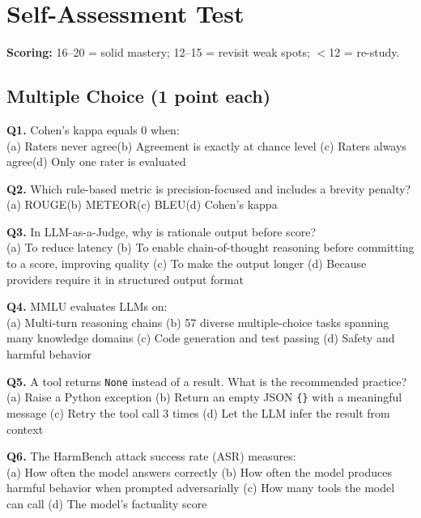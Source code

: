 \documentclass[11pt, a4paper]{article}
\begin{document}
\newpage
\section{Self-Assessment Test}

\textbf{Scoring:} 16--20 = solid mastery; 12--15 = revisit weak spots; $<$12 = re-study.

\subsection*{Multiple Choice (1 point each)}

\textbf{Q1.} Cohen's kappa equals 0 when:\\
(a) Raters never agree\quad (b) Agreement is exactly at chance level\quad
(c) Raters always agree\quad (d) Only one rater is evaluated

\textbf{Q2.} Which rule-based metric is precision-focused and includes a brevity penalty?\\
(a) ROUGE\quad (b) METEOR\quad (c) BLEU\quad (d) Cohen's kappa

\textbf{Q3.} In LLM-as-a-Judge, why is rationale output before score?\\
(a) To reduce latency\quad
(b) To enable chain-of-thought reasoning before committing to a score, improving quality\quad
(c) To make the output longer\quad
(d) Because providers require it in structured output format

\textbf{Q4.} MMLU evaluates LLMs on:\\
(a) Multi-turn reasoning chains\quad
(b) 57 diverse multiple-choice tasks spanning many knowledge domains\quad
(c) Code generation and test passing\quad
(d) Safety and harmful behavior

\textbf{Q5.} A tool returns \texttt{None} instead of a result. What is the recommended practice?\\
(a) Raise a Python exception\quad
(b) Return an empty JSON \texttt{\{\}} with a meaningful message\quad
(c) Retry the tool call 3 times\quad
(d) Let the LLM infer the result from context

\textbf{Q6.} The HarmBench attack success rate (ASR) measures:\\
(a) How often the model answers correctly\quad
(b) How often the model produces harmful behavior when prompted adversarially\quad
(c) How many tools the model can call\quad
(d) The model's factuality score
\end{document}
